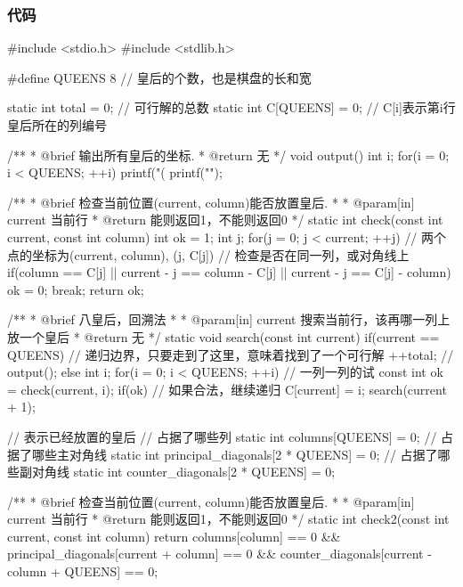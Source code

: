\subsubsection{代码}
\begin{Codex}[label=eight_queen.c]
#include <stdio.h>
#include <stdlib.h>

#define QUEENS 8 // 皇后的个数，也是棋盘的长和宽

static int total = 0;	// 可行解的总数
static int C[QUEENS] = {0};	// C[i]表示第i行皇后所在的列编号


/** 
 * @brief 输出所有皇后的坐标.
 * @return 无
 */
void output() {
    int i;
    for(i = 0; i < QUEENS; ++i) {
        printf("(%
    }
    printf("\n");
}


/** 
 * @brief 检查当前位置(current, column)能否放置皇后.
 *
 * @param[in] current 当前行
 * @return 能则返回1，不能则返回0
 */
static int check(const int current, const int column) {
    int ok = 1;
    int j;
    for(j = 0; j < current; ++j) {
        // 两个点的坐标为(current, column), (j, C[j])
        // 检查是否在同一列，或对角线上
        if(column == C[j] || current - j == column - C[j] || 
            current - j == C[j] - column) {
            ok = 0;
            break;
        }
    }
    return ok;
}

/** 
 * @brief 八皇后，回溯法
 *
 * @param[in] current 搜索当前行，该再哪一列上放一个皇后
 * @return 无
 */
static void search(const int current) {
    if(current == QUEENS) {  // 递归边界，只要走到了这里，意味着找到了一个可行解
        ++total;
        // output();
    } else {
        int i;
        for(i = 0; i < QUEENS; ++i) {  // 一列一列的试
            const int ok = check(current, i);
            if(ok) {  // 如果合法，继续递归
                C[current] = i;
                search(current + 1);
            }
        }
    }
}

// 表示已经放置的皇后
// 占据了哪些列
static int columns[QUEENS] = {0};
// 占据了哪些主对角线
static int principal_diagonals[2 * QUEENS] = {0};
// 占据了哪些副对角线
static int counter_diagonals[2 * QUEENS] = {0};


/** 
 * @brief 检查当前位置(current, column)能否放置皇后.
 *
 * @param[in] current 当前行
 * @return 能则返回1，不能则返回0
 */
static int check2(const int current, const int column) {
    return columns[column] == 0 && principal_diagonals[current + column] == 0 
        && counter_diagonals[current - column + QUEENS] == 0;
}


\end{Codex}
